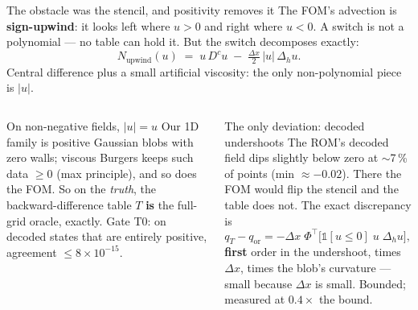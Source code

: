 \documentclass[10pt,aspectratio=169]{beamer}
\newcommand{\T}{^{\top}}
\begin{document}
\begin{frame}{The obstacle was the stencil, and positivity removes it}
  \small The FOM's advection is \textbf{sign-upwind}: it looks left where $u>0$ and right where $u<0$. A switch is not a polynomial --- no table can hold it. But the switch decomposes exactly:
  \[
    N_{\text{upwind}}(u) \;=\; u\,D^{c}u \;-\; \tfrac{\Delta x}{2}\,|u|\,\Delta_h u .
  \]
  Central difference plus a small artificial viscosity: the only non-polynomial piece is $|u|$.
  \footnotesize
  \begin{columns}[T]
    \begin{block}{On non-negative fields, $|u| = u$}
      Our 1D family is positive Gaussian blobs with zero walls; viscous Burgers keeps such data $\ge 0$ (max principle), and so does the FOM. So on the \emph{truth}, the backward-difference table $T$ \textbf{is} the full-grid oracle, exactly. Gate T0: on decoded states that are entirely positive, agreement $\le 8\times10^{-15}$.
    \end{block}
    \begin{alertblock}{The only deviation: decoded undershoots}
      The ROM's decoded field dips slightly below zero at $\sim$7\,\% of points (min $\approx -0.02$). There the FOM would flip the stencil and the table does not. The exact discrepancy is
      \[
        q_T - q_{\text{or}} = -\Delta x\;\Phi\T\big[\mathbb 1[u\le0]\;u\;\Delta_h u\big],
      \]
      \textbf{first} order in the undershoot, times $\Delta x$, times the blob's curvature --- small because $\Delta x$ is small. Bounded; measured at $0.4\times$ the bound.
    \end{alertblock}
  \end{columns}
\end{frame}
\end{document}
